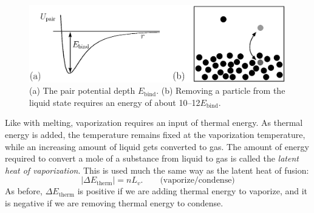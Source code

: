 \begin{figure}
\begin{center}
\includegraphics[width=4.4in]{liquids_and_gases/boiling.eps}
\caption{(a) The pair potential depth $E_\text{bind}$.  (b) Removing a particle
from the liquid state requires an energy of about 10--12$E_\text{bind}$.}
\label{fig:boiling} 
\end{center}
\end{figure}

Like with melting, vaporization requires an input of thermal energy.
As thermal energy is added, the temperature remains fixed at the
vaporization temperature, while an increasing amount of liquid gets
converted to gas.  The amount of energy required to convert a mole of
a substance from liquid to gas is called the {\it latent heat of
  vaporization}.  This is used much the same way as the latent heat of
fusion:
\begin{equation}
  |\Delta E_\text{therm}| = nL_v. \qquad\text{(vaporize/condense)}
\end{equation}
As before, $\Delta E_\text{therm}$ is positive if we are adding
thermal energy to vaporize, and it is negative if we are removing
thermal energy to condense.


